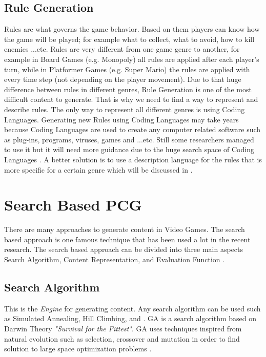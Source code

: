 \subsection{Rule Generation}
Rules are what governs the game behavior. Based on them players can know how the game will be played; for example what to collect, what to avoid, how to kill enemies ...etc. Rules are very different from one game genre to another, for example in Board Games (e.g. Monopoly) all rules are applied after each player's turn, while in Platformer Games (e.g. Super Mario) the rules are applied with every time step (not depending on the player movement). Due to that huge difference between rules in different genres, Rule Generation is one of the most difficult content to generate. That is why we need to find a way to represent and describe rules. The only way to represent all different genres is using Coding Languages. Generating new Rules using Coding Languages may take years because Coding Languages are used to create any computer related software such as plug-ins, programs, viruses, games and ...etc. Still some researchers managed to use it but it will need more guidance due to the huge search space of Coding Languages \cite{mechanicMiner}. A better solution is to use a description language for the rules that is more specific for a certain genre which will be discussed in  \cite{pcgBookRules}.
 
\section{Search Based PCG}
There are many approaches to generate content in Video Games. The search based approach is one famous technique that has been used a lot in the recent research. The search based approach can be divided into three main aspects Search Algorithm, Content Representation, and Evaluation Function \cite{pcgBookSearch}.

\subsection{Search Algorithm}
This is the \emph{Engine} for generating content. Any search algorithm can be used such as Simulated Annealing, Hill Climbing, and . GA is a search algorithm based on Darwin Theory \textit{"Survival for the Fittest"}. GA uses techniques inspired from natural evolution such as selection, crossover and mutation in order to find solution to large space optimization problems \cite{geneticAlgorithm}.

